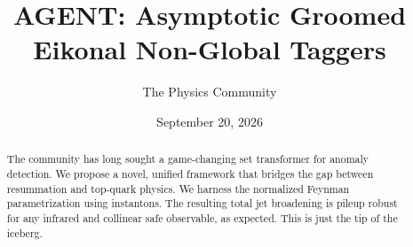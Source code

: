 \documentclass[11pt]{article}
\title{AGENT: Asymptotic Groomed Eikonal Non-Global Taggers}
\author{The Physics Community}
\date{September 20, 2026}
\begin{document}
\maketitle
\begin{abstract}
The community has long sought a game-changing set transformer for
anomaly detection. We propose a novel, unified framework that bridges
the gap between resummation and top-quark physics. We harness the
normalized Feynman parametrization using instantons. The resulting total
jet broadening is pileup robust for any infrared and collinear safe
observable, as expected. This is just the tip of the iceberg.
\end{abstract}
\tableofcontents



\nocite{*}


\end{document}
